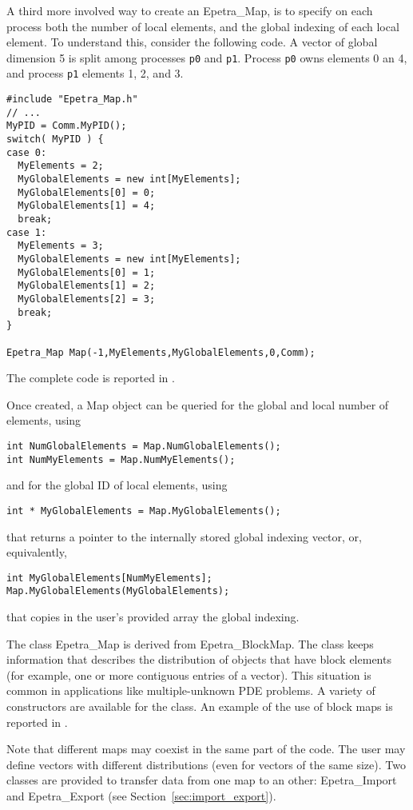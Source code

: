 A third more involved way to create an Epetra\_Map, is to specify on
each process both the number of local elements, and the global indexing
of each local element. To understand this, consider the following code.
A vector of global dimension 5 is split among processes \verb!p0! and
\verb!p1!. Process \verb!p0! owns elements 0 an 4, and process \verb!p1!
elements 1, 2, and 3.
\begin{verbatim}
#include "Epetra_Map.h"
// ...
MyPID = Comm.MyPID();
switch( MyPID ) {
case 0:
  MyElements = 2;
  MyGlobalElements = new int[MyElements];
  MyGlobalElements[0] = 0;
  MyGlobalElements[1] = 4;
  break;
case 1:
  MyElements = 3;
  MyGlobalElements = new int[MyElements];
  MyGlobalElements[0] = 1;
  MyGlobalElements[1] = 2;
  MyGlobalElements[2] = 3;
  break;
}

Epetra_Map Map(-1,MyElements,MyGlobalElements,0,Comm);
\end{verbatim}
The complete code is reported in .

Once created, a Map object can be queried for the global and local
number of elements, using
\begin{verbatim}
int NumGlobalElements = Map.NumGlobalElements();
int NumMyElements = Map.NumMyElements();
\end{verbatim}
and for the global ID of local elements, using
\begin{verbatim}
int * MyGlobalElements = Map.MyGlobalElements();
\end{verbatim}
that returns a pointer to the internally stored global indexing vector,
or, equivalently,
\begin{verbatim}
int MyGlobalElements[NumMyElements];
Map.MyGlobalElements(MyGlobalElements);
\end{verbatim}
that copies in the user's provided array the global indexing. 

 \bigskip

The class Epetra\_Map is derived from Epetra\_BlockMap. The class keeps
information that describes the distribution of objects that have block
elements (for example, one or more contiguous entries of a vector). This
situation is common in applications like multiple-unknown PDE problems.
A variety of constructors are available for the class. An example of the
use of block maps is reported in .

\smallskip

Note that different maps may coexist in the same part of the code.  The
user may define vectors with different distributions (even for vectors
of the same size).  Two classes are provided to transfer data from one
map to an other: Epetra\_Import and Epetra\_Export (see
Section~\ref{sec:import_export}).

